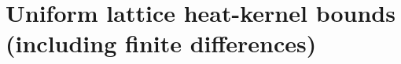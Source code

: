 \section{Uniform lattice heat-kernel bounds (including finite differences)}
\label{app:lattice_heat_kernel}


